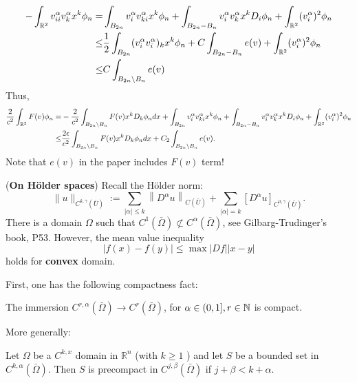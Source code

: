 \documentclass[a4paper,12pt]{article}
\begin{document}
$$ \begin{aligned}
   -\int_{{\mathbb R}^2} v_{ii}^{\alpha }v_{k}^{\alpha }x^k \phi_n=& \int_{B_{2n}} v_{i}^{\alpha }v_{ki}^{\alpha } x^k\phi_n+\int_{B_{2n}-B_{n}} v_{i}^{\alpha }v_{k}^{\alpha }x^k D_{i}\phi_n+\int_{{\mathbb R}^2}^{} (v_{i}^{\alpha })^2 \phi _n\\
    \leq &\frac{1}{2}\int_{B_{2n}}( v_{i}^{\alpha }v_{i}^{\alpha })_k x^k \phi_n +C \int_{B_{2n}-B_{n}} e(v) +\int_{{\mathbb R}^2}^{} (v_{i}^{\alpha })^2 \phi _n\\
    \leq & C \int_{B_{2n}\setminus B_{n}} e(v)
\end{aligned} $$
Thus,
$$ \begin{aligned}
  \frac{2}{c^2}\int_{{\mathbb R}^2}^{}F(v)\phi _n =&- \frac{2}{c^2}\int_{B_{2n}\setminus{B_n}} F(v) x^kD_k \phi _n dx+
  \int_{B_{2n}} v_{i}^{\alpha }v_{ki}^{\alpha } x^k\phi_n+\int_{B_{2n}-B_{n}} v_{i}^{\alpha }v_{k}^{\alpha }x^k D_{i}\phi_n+\int_{{\mathbb R}^2}^{} (v_{i}^{\alpha })^2 \phi _n\\
   \leq & \frac{2 \epsilon }{c^2}\int_{B_{2n}\setminus{B_n}} F(v) x^kD_k \phi _n dx  +C_2 \int_{B_{2n}\setminus B_{n}} e(v).
\end{aligned}  $$
Note that $e(v)$ in the paper includes $F(v)$ term!     

\np (\textbf{On H\"older spaces})
Recall the H\"older norm:
\begin{equation}
     \|u\|_{C^{k, \gamma}(\bar{U})}:=\sum_{|\alpha| \leq k}\left\|D^\alpha u\right\|_{C(\bar{U})}+\sum_{|\alpha|=k}\left[D^\alpha u\right]_{C^{0, \gamma}(\bar{U})}.
\end{equation}
There is a domain $\Omega $ such that $C^1(\bar{\Omega })\not \subset C^{\alpha }(\bar{\Omega })$, see Gilbarg-Trudinger's book, P53. However,  the mean value inequality 
$$|f(x)-f(y)|\leq \max |Df| |x-y|$$
 holds for \textbf{convex} domain.

 First, one has the following compactness fact:
\begin{proposition}
    The immersion $C^{r,\alpha }(\bar{\Omega }) \to C^{r}(\bar{\Omega })$, for $\alpha \in (0,1], r \in {\mathbb N}$ is compact.   
\end{proposition}
More generally:
\begin{lemma}
     Let $\Omega$ be a $C^{k, x}$ domain in $\mathbb{R}^n$ (with $k \geqslant 1$ ) and let $S$ be a bounded set in $C^{k, \alpha}(\bar{\Omega})$. Then $S$ is precompact in $C^{j, \beta}(\bar{\Omega})$ if $j+\beta<k+\alpha$.
\end{lemma}
\end{document}
